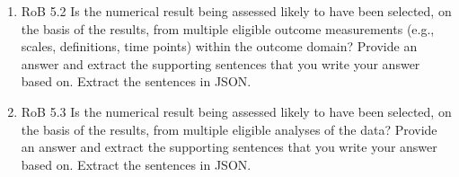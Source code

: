 \documentclass[sn-mathphys,Numbered]{sn-jnl}%
\begin{document}
\begin{enumerate}
    \item RoB 5.2 Is the numerical result being assessed likely to have been selected, on the basis of the results, from multiple eligible outcome measurements (e.g., scales, definitions, time points) within the outcome domain?  Provide an answer and extract the supporting sentences that you write your answer based on. Extract the sentences in JSON.
    \item RoB 5.3 Is the numerical result being assessed likely to have been selected, on the basis of the results, from multiple eligible analyses of the data?  Provide an answer and extract the supporting sentences that you write your answer based on. Extract the sentences in JSON.
\end{enumerate}





%
%
%
%
\end{document}
